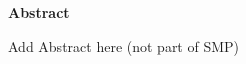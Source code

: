 \begin{center}
  {\large \bfseries \noindent Abstract}
\end{center}

Add Abstract here  (not part of SMP)